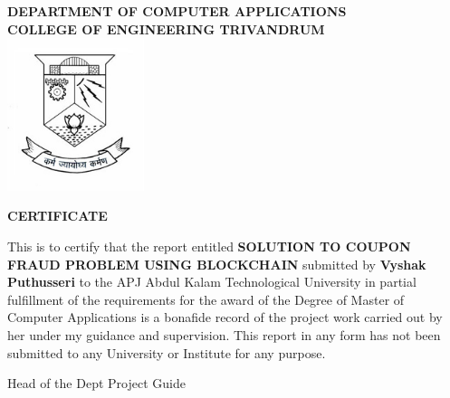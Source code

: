\begin{titlepage}
\begin{center}

\textbf{DEPARTMENT OF COMPUTER APPLICATIONS}\\[0.5cm]
\textbf{ COLLEGE OF ENGINEERING TRIVANDRUM}\\
[0.5cm]

\vspace{1.2cm}
\includegraphics[width=0.30\textwidth]{2.jpg}\\
\vspace{0.8cm}

\large\textbf{CERTIFICATE}\\
\end{center}

This is to certify that the report entitled 
\textbf{SOLUTION TO COUPON FRAUD PROBLEM USING BLOCKCHAIN} submitted by
\textbf{Vyshak Puthusseri} to the APJ Abdul Kalam Technological University in partial
fulfillment of the requirements for the award of the Degree of Master of
Computer Applications is a bonafide record of the project work carried out by
her under my guidance and supervision. This report in any form has not been
submitted to any University or Institute for any purpose.

\vspace{4 cm}

\noindent Head of the Dept
\hfill Project Guide
\\ \\\\


\end{titlepage}
